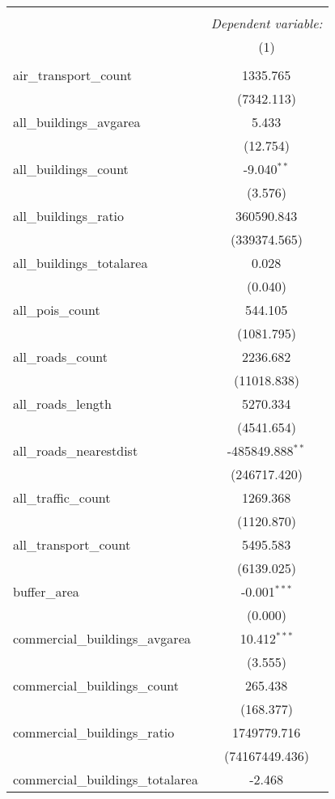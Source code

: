 \begin{table}[!htbp] \centering
\begin{tabular}{@{\extracolsep{5pt}}lc}
\\[-1.8ex]\hline
\hline \\[-1.8ex]
& \multicolumn{1}{c}{\textit{Dependent variable:}} \
\cr \cline{1-2}
\\[-1.8ex] & (1) \\
\hline \\[-1.8ex]
 air_transport_count & 1335.765$^{}$ \\
  & (7342.113) \\
 all_buildings_avgarea & 5.433$^{}$ \\
  & (12.754) \\
 all_buildings_count & -9.040$^{**}$ \\
  & (3.576) \\
 all_buildings_ratio & 360590.843$^{}$ \\
  & (339374.565) \\
 all_buildings_totalarea & 0.028$^{}$ \\
  & (0.040) \\
 all_pois_count & 544.105$^{}$ \\
  & (1081.795) \\
 all_roads_count & 2236.682$^{}$ \\
  & (11018.838) \\
 all_roads_length & 5270.334$^{}$ \\
  & (4541.654) \\
 all_roads_nearestdist & -485849.888$^{**}$ \\
  & (246717.420) \\
 all_traffic_count & 1269.368$^{}$ \\
  & (1120.870) \\
 all_transport_count & 5495.583$^{}$ \\
  & (6139.025) \\
 buffer_area & -0.001$^{***}$ \\
  & (0.000) \\
 commercial_buildings_avgarea & 10.412$^{***}$ \\
  & (3.555) \\
 commercial_buildings_count & 265.438$^{}$ \\
  & (168.377) \\
 commercial_buildings_ratio & 1749779.716$^{}$ \\
  & (74167449.436) \\
 commercial_buildings_totalarea & -2.468$^{}$ \\

\end{tabular}
\end{table}
